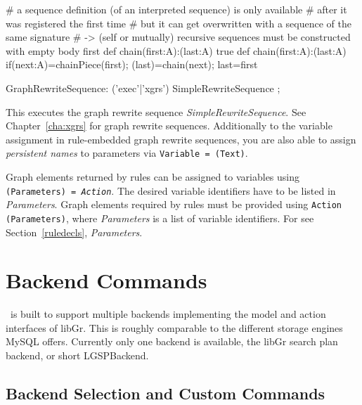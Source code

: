 \begin{example}
\begin{grgen}
# a sequence definition (of an interpreted sequence) is only available
# after it was registered the first time
# but it can get overwritten with a sequence of the same signature
# -> (self or mutually) recursive sequences must be constructed with empty body first
def chain(first:A):(last:A){ true }
def chain(first:A):(last:A){ if{(next:A)=chainPiece(first); (last)=chain(next); last=first} }
\end{grgen}
\end{example}

\makeatletter
\begin{rail}
  GraphRewriteSequence: ('exec'|'xgrs') SimpleRewriteSequence ;
\end{rail}
This executes the graph rewrite sequence \emph{SimpleRewriteSequence}.
See Chapter~\ref{cha:xgrs} for graph rewrite sequences.
Additionally to the variable assignment in rule-embedded graph rewrite sequences, you are also able to assign \emph{persistent names} to parameters via  \texttt{Variable = \@(Text)}.

Graph elements returned by rules can be assigned to variables using \texttt{(Para\-meters) = \emph{Action}}.
The desired variable identifiers have to be listed in \emph{Parameters}.
Graph elements required by rules must be provided using \texttt{Action (Para\-meters)}, where \emph{Parameters} is a list of variable identifiers.
For  see Section~\ref{ruledecls}, \emph{Parameters}.


\section{Backend Commands}
\label{backend}

\GrG\ is built to support multiple backends implementing the model and action interfaces of libGr.
This is roughly comparable to the different storage engines MySQL offers.
Currently only one backend is available, the libGr search plan backend, or short LGSPBackend.

\subsection{Backend Selection and Custom Commands}

